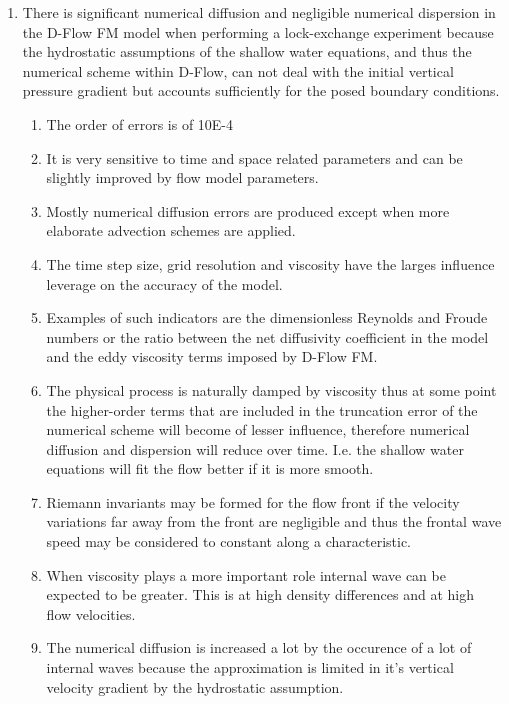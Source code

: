 \begin{enumerate}
\def\labelenumi{\arabic{enumi}.}
\item
  There is significant numerical diffusion and negligible numerical
  dispersion in the D-Flow FM model when performing a lock-exchange
  experiment because the hydrostatic assumptions of the shallow water
  equations, and thus the numerical scheme within D-Flow, can not deal
  with the initial vertical pressure gradient but accounts sufficiently
  for the posed boundary conditions.

  \begin{enumerate}
  \def\labelenumii{\arabic{enumii}.}
  \item
    The order of errors is of 10E-4
  \item
    It is very sensitive to time and space related parameters and can be
    slightly improved by flow model parameters.
  \item
    Mostly numerical diffusion errors are produced except when more
    elaborate advection schemes are applied.
  \item
    The time step size, grid resolution and viscosity have the larges
    influence leverage on the accuracy of the model.
  \item
    Examples of such indicators are the dimensionless Reynolds and
    Froude numbers or the ratio between the net diffusivity coefficient
    in the model and the eddy viscosity terms imposed by D-Flow FM.
  \item
    The physical process is naturally damped by viscosity thus at some
    point the higher-order terms that are included in the truncation
    error of the numerical scheme will become of lesser influence,
    therefore numerical diffusion and dispersion will reduce over time.
    I.e. the shallow water equations will fit the flow better if it is
    more smooth.
  \item
    Riemann invariants may be formed for the flow front if the velocity
    variations far away from the front are negligible and thus the
    frontal wave speed may be considered to constant along a
    characteristic.
  \item
    When viscosity plays a more important role internal wave can be
    expected to be greater. This is at high density differences and at
    high flow velocities.
  \item
    The numerical diffusion is increased a lot by the occurence of a lot
    of internal waves because the approximation is limited in it's
    vertical velocity gradient by the hydrostatic assumption.
  \end{enumerate}
\end{enumerate}
